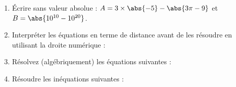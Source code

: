 %
%
\enlargethispage{\baselineskip}
\begin{exr}
    \begin{enumerate}
    \item \'Ecrire sans valeur absolue : $A=3\times\abs{-5}-\abs{3\pi-9}$ et $B=\abs{10^{10}-10^{20}}$.
    \item Interpréter les équations en terme de distance avant de les résoudre en utilisant la droite numérique :
    \item Résolvez (algébriquement) les équations suivantes :
    \item Résoudre les inéquations suivantes :
\end{enumerate}
\end{exr}


